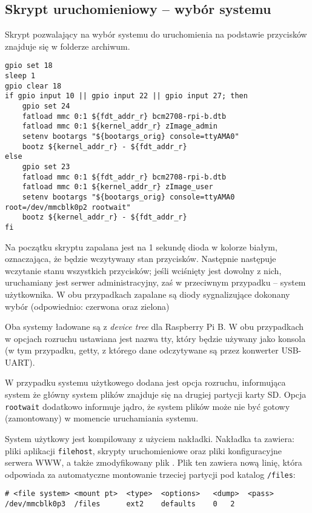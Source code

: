 \documentclass[10pt,a4paper]{article}
\begin{document}
\subsection{Skrypt uruchomieniowy -- wybór systemu}

Skrypt pozwalający na wybór systemu do uruchomienia na podstawie przycisków znajduje się
w folderze  archiwum.

\begin{lstlisting}[caption=Zawartość skryptu uruchomieniowego]
gpio set 18
sleep 1
gpio clear 18
if gpio input 10 || gpio input 22 || gpio input 27; then
	gpio set 24
	fatload mmc 0:1 ${fdt_addr_r} bcm2708-rpi-b.dtb
	fatload mmc 0:1 ${kernel_addr_r} zImage_admin
	setenv bootargs "${bootargs_orig} console=ttyAMA0"
	bootz ${kernel_addr_r} - ${fdt_addr_r}
else
	gpio set 23
	fatload mmc 0:1 ${fdt_addr_r} bcm2708-rpi-b.dtb
	fatload mmc 0:1 ${kernel_addr_r} zImage_user
	setenv bootargs "${bootargs_orig} console=ttyAMA0 root=/dev/mmcblk0p2 rootwait"
	bootz ${kernel_addr_r} - ${fdt_addr_r}
fi
\end{lstlisting}
Na początku skryptu zapalana jest na 1 sekundę dioda w kolorze białym, oznaczająca, że będzie
wczytywany stan przycisków. Następnie następuje wczytanie stanu wszystkich przycisków; jeśli
wciśnięty jest dowolny z nich, uruchamiany jest serwer administracyjny, zaś w przeciwnym
przypadku -- system użytkownika. W obu przypadkach zapalane są diody sygnalizujące dokonany
wybór (odpowiednio: czerwona oraz zielona)

Oba systemy ładowane są z \emph{device tree} dla Raspberry Pi B. W obu przypadkach w opcjach
rozruchu ustawiana jest nazwa tty, który będzie używany jako konsola (w tym przypadku, getty,
z którego dane odczytywane są przez konwerter USB-UART).

W przypadku systemu użytkowego dodana jest opcja rozruchu, informująca system że główny
system plików znajduje się na drugiej partycji karty SD. Opcja \texttt{rootwait} dodatkowo
informuje jądro, że system plików może nie być gotowy (zamontowany) w momencie uruchamiania
systemu.

System użytkowy jest kompilowany z użyciem nakładki. Nakładka ta zawiera: pliki aplikacji
\texttt{filehost}, skrypty uruchomieniowe oraz pliki konfiguracyjne serwera WWW, a także
zmodyfikowany plik . Plik ten zawiera nową linię, która odpowiada
za automatyczne montowanie trzeciej partycji pod katalog \texttt{/files}:
\begin{lstlisting}[caption=Linia dodana do pliku \directory{/etc/fstab}]
# <file system>	<mount pt>	<type>	<options>	<dump>	<pass>
/dev/mmcblk0p3	/files		ext2	defaults	0	2
\end{lstlisting}
\end{document}
